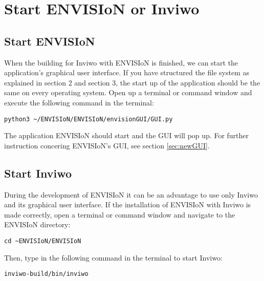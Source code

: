 \section{Start ENVISIoN or Inviwo}
\label{sec: start envision}
\subsection{Start ENVISIoN}
When the building for Inviwo with ENVISIoN is finished, we can start the application's graphical user interface. If you have structured the file system as explained in section 2 and section 3, the start up of the application should be the same on every operating system. Open up a terminal or command window and execute the following command in the terminal:

\begin{lstlisting}[frame = single, breaklines = true]
    python3 ~/ENVISIoN/ENVISIoN/envisionGUI/GUI.py
\end{lstlisting}

The application ENVISIoN should start and the GUI will pop up. For further instruction concering ENVISIoN's GUI, see section \ref{sec:newGUI}.

\subsection{Start Inviwo}
During the development of ENVISIoN it can be an advantage to use only Inviwo and its graphical user interface. If the installation of ENVISIoN with Inviwo is made correctly, open a terminal or command window and navigate to the ENVISIoN directory: 

\begin{lstlisting}[frame = single, breaklines = true]
    cd ~ENVISIoN/ENVISIoN
\end{lstlisting}

Then, type in the following command in the terminal to start Inviwo:

\begin{lstlisting}[frame = single, breaklines = true]
    inviwo-build/bin/inviwo
\end{lstlisting}